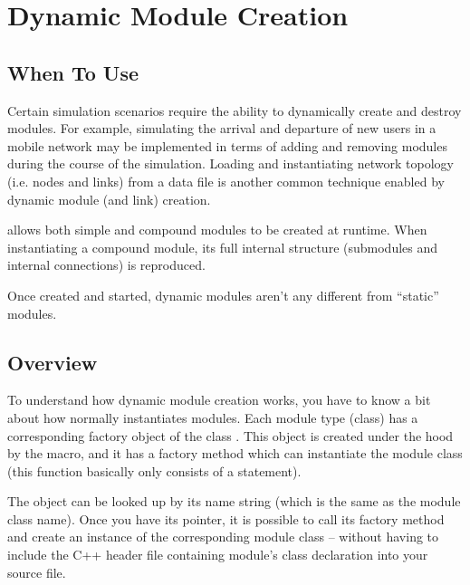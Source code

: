 \section{Dynamic Module Creation}
\label{sec:simple-modules:creating-modules}

\subsection{When To Use}
\label{sec:simple-modules:dynamic-creation:when-to-use}

Certain simulation scenarios require the ability to dynamically create
and destroy modules. For example, simulating the arrival and departure
of new users in a mobile network may be implemented in terms of adding
and removing modules during the course of the simulation. Loading and
instantiating network topology (i.e. nodes and links) from a data file
is another common technique enabled by dynamic module (and link) creation.

{\opp} allows both simple and compound modules to be created at runtime.
When instantiating a compound module, its full internal structure
(submodules and internal connections) is reproduced.

Once created and started, dynamic modules aren't any different from
``static'' modules.


\subsection{Overview}
\label{sec:simple-modules:dynamic-creation:overview}

To understand how dynamic module creation works, you have to know a
bit about how {\opp} normally instantiates modules. Each module type
(class) has a corresponding factory object of the class
. This object is created under the hood by the
 macro, and it has a factory
method which can instantiate the module class (this function basically
only consists of a  statement).

The  object can be looked up by its name
string (which is the same as the module class name). Once you have its
pointer, it is possible to call its factory method and create an
instance of the corresponding module class -- without having to
include the C++ header file containing module's class declaration
into your source file.

